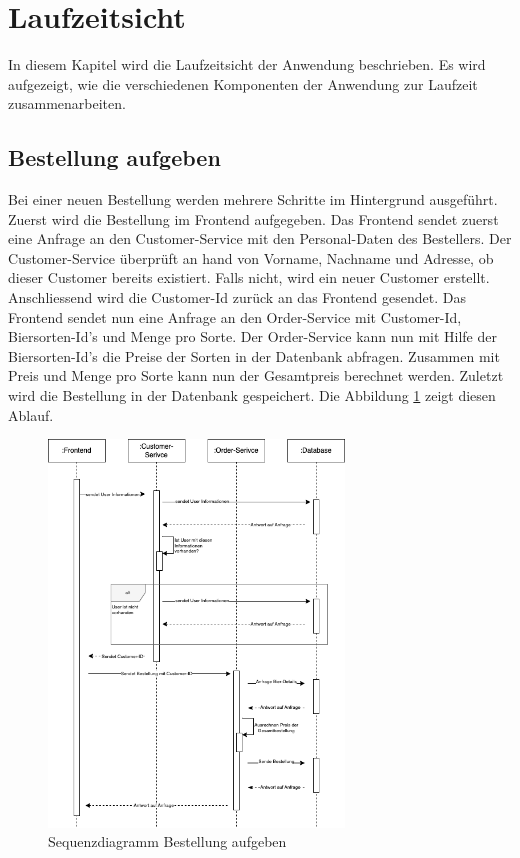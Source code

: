 
\section{Laufzeitsicht}
\label{sec:laufzeitsicht}
In diesem Kapitel wird die Laufzeitsicht der Anwendung beschrieben. Es wird aufgezeigt, wie die verschiedenen Komponenten der Anwendung zur Laufzeit zusammenarbeiten.

\subsection{Bestellung aufgeben}
\label{subsec:bestellung-aufgeben}
Bei einer neuen Bestellung werden mehrere Schritte im Hintergrund ausgeführt. Zuerst wird die Bestellung im Frontend aufgegeben. Das Frontend sendet zuerst eine Anfrage an den Customer-Service mit den Personal-Daten des Bestellers. Der Customer-Service überprüft an hand von Vorname, Nachname und Adresse, ob dieser Customer bereits existiert. Falls nicht, wird ein neuer Customer erstellt. Anschliessend wird die Customer-Id zurück an das Frontend gesendet. Das Frontend sendet nun eine Anfrage an den Order-Service mit Customer-Id, Biersorten-Id's und Menge pro Sorte. Der Order-Service kann nun mit Hilfe der Biersorten-Id's die Preise der Sorten in der Datenbank abfragen. Zusammen mit Preis und Menge pro Sorte kann nun der Gesamtpreis berechnet werden. Zuletzt wird die Bestellung in der Datenbank gespeichert. Die Abbildung \ref{fig:bestellung-aufgeben} zeigt diesen Ablauf.

\begin{figure}[H]
    \centering
    \includegraphics[width=0.7\textwidth]{images/laufzeitsicht_bestellung.png}
    \caption{Sequenzdiagramm Bestellung aufgeben}
    \label{fig:bestellung-aufgeben}
\end{figure}
